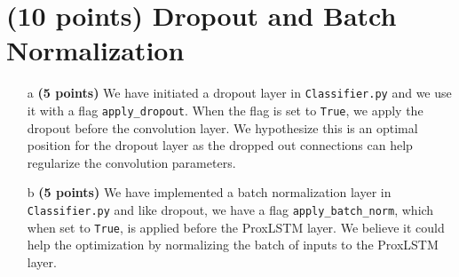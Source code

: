 \documentclass[11pt]{report}
\begin{document}
\section{(10 points) Dropout and Batch Normalization}
\begin{itemize}
    \item[a] \textbf{(5 points)} We have initiated a dropout layer in \texttt{Classifier.py} and we use it with a flag \texttt{apply\_dropout}. When the flag is set to \texttt{True}, we apply the dropout before the convolution layer. We hypothesize this is an optimal position for the dropout layer as the dropped out connections can help regularize the convolution parameters.
    \item[b] \textbf{(5 points)} We have implemented a batch normalization layer in \texttt{Classifier.py} and like dropout, we have a flag \texttt{apply\_batch\_norm}, which when set to \texttt{True}, is applied before the ProxLSTM layer. We believe it could help the optimization by normalizing the batch of inputs to the ProxLSTM layer. 
\end{itemize}
\end{document}
